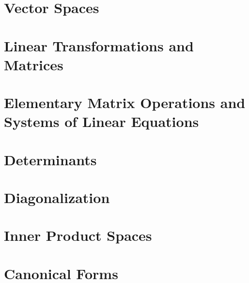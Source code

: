\documentclass{report}
\theoremstyle{definition}
\begin{document}
\tableofcontents

\chapter{Vector Spaces}






 

\chapter{Linear Transformations and Matrices}








\chapter{Elementary Matrix Operations and Systems of Linear Equations}





\chapter{Determinants}




 

\chapter{Diagonalization}





\chapter{Inner Product Spaces}












\chapter{Canonical Forms}








\end{document}
